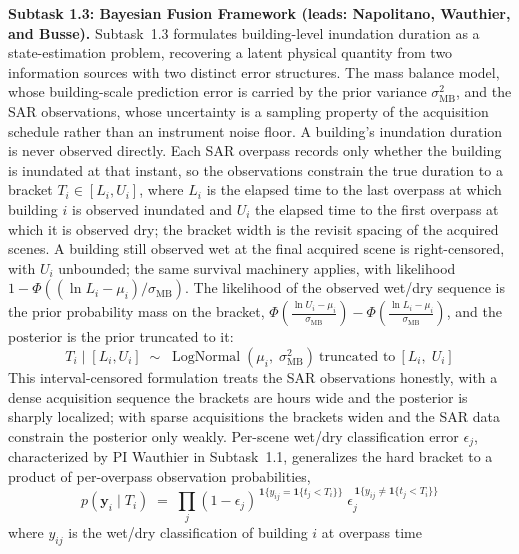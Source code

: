 \documentclass[11pt]{article}
\begin{document}
\textbf{Subtask 1.3: Bayesian Fusion Framework (leads: Napolitano, Wauthier,
and Busse).}
Subtask~1.3 formulates building-level inundation duration as a state-estimation
problem, recovering a latent physical quantity from two information sources with
two distinct error structures. The mass balance model, whose building-scale
prediction error is
carried by the prior variance $\sigma_{\mathrm{MB}}^2$, and the SAR observations,
whose uncertainty is a sampling property of the acquisition schedule rather than
an instrument noise floor.
A building's inundation duration is never observed directly. Each SAR overpass
records only whether the building is inundated at that instant, so the
observations constrain the true duration to a bracket $T_i \in [L_i, U_i]$, where $L_i$ is the elapsed time to the last overpass at which building $i$ is
observed inundated and $U_i$ the elapsed time to the first overpass at which it
is observed dry; the bracket width is the revisit spacing of the acquired scenes.
A building still observed wet at the final acquired scene is right-censored, with
$U_i$ unbounded; the same survival machinery applies, with likelihood
$1 - \Phi\!\left((\ln L_i - \mu_i)/\sigma_{\mathrm{MB}}\right)$.
The likelihood of the observed wet/dry sequence is the prior probability mass on
the bracket,
$\Phi\!\left(\tfrac{\ln U_i - \mu_i}{\sigma_{\mathrm{MB}}}\right) -
 \Phi\!\left(\tfrac{\ln L_i - \mu_i}{\sigma_{\mathrm{MB}}}\right)$,
and the posterior is the prior truncated to it:
\begin{equation}\label{eq:posterior}
  T_i \mid [L_i, U_i] \;\sim\;
  \operatorname{LogNormal}(\mu_i,\; \sigma_{\mathrm{MB}}^2)
  \ \text{truncated to}\ [L_i,\; U_i]
\end{equation}
This interval-censored formulation treats the SAR observations honestly, with a
dense acquisition sequence the brackets are hours wide and the posterior is
sharply localized; with sparse acquisitions the brackets widen and the SAR data
constrain the posterior only weakly.
Per-scene wet/dry classification error $\epsilon_j$, characterized by PI Wauthier
in Subtask~1.1, generalizes the hard bracket to a product of per-overpass
observation probabilities,
\begin{equation}\label{eq:softbracket}
  p(\bm{y}_i \mid T_i) \;=\; \prod_{j}
  (1-\epsilon_j)^{\,\mathbf{1}\{y_{ij} = \mathbf{1}\{t_j < T_i\}\}}\;
  \epsilon_j^{\,\mathbf{1}\{y_{ij} \neq \mathbf{1}\{t_j < T_i\}\}}
\end{equation}
where $y_{ij}$ is the wet/dry classification of building $i$ at overpass time
\end{document}
